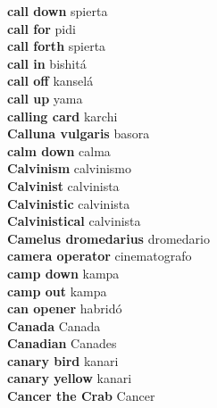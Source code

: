 \textbf{ call down  } spierta \\
\textbf{ call for  } pidi \\
\textbf{ call forth  } spierta \\
\textbf{ call in  } bishitá \\
\textbf{ call off  } kanselá \\
\textbf{ call up  } yama \\
\textbf{ calling card  } karchi \\
\textbf{ Calluna vulgaris  } basora \\
\textbf{ calm down  } calma \\
\textbf{ Calvinism  } calvinismo \\
\textbf{ Calvinist  } calvinista \\
\textbf{ Calvinistic  } calvinista \\
\textbf{ Calvinistical  } calvinista \\
\textbf{ Camelus dromedarius  } dromedario \\
\textbf{ camera operator  } cinematografo \\
\textbf{ camp down  } kampa \\
\textbf{ camp out  } kampa \\
\textbf{ can opener  } habridó \\
\textbf{ Canada  } Canada \\
\textbf{ Canadian  } Canades \\
\textbf{ canary bird  } kanari \\
\textbf{ canary yellow  } kanari \\
\textbf{ Cancer the Crab  } Cancer \\
